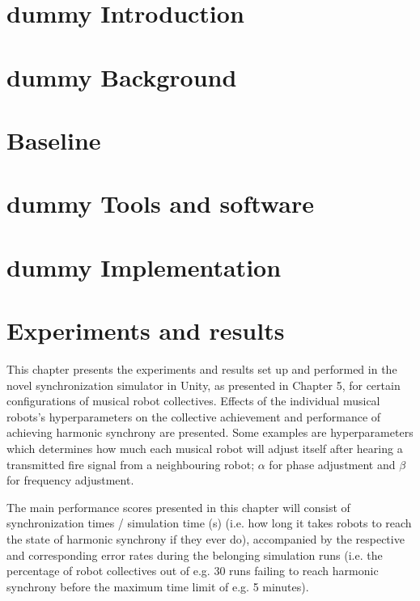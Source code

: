 


	\chapter{dummy Introduction}
	\chapter{dummy Background}
	\chapter{Baseline}
	\chapter{dummy Tools and software}
	\chapter{dummy Implementation}
	\chapter{Experiments and results}
	\setcounter{page}{1}
	\label{chap:experiments_and_results}
	
	This chapter presents the experiments and results set up and performed in the novel synchronization simulator in Unity, as presented in Chapter 5, for certain configurations of musical robot collectives. Effects of the individual musical robots's hyperparameters on the collective achievement and performance of achieving harmonic synchrony are presented. Some examples are hyperparameters which determines how much each musical robot will adjust itself after hearing a transmitted fire signal from a neighbouring robot; $\alpha$ for phase adjustment and $\beta$ for frequency adjustment.

	The main performance scores presented in this chapter will consist of synchronization times / simulation time (s) (i.e. how long it takes robots to reach the state of harmonic synchrony if they ever do), accompanied by the respective and corresponding error rates during the belonging simulation runs (i.e. the percentage of robot collectives out of e.g. 30 runs failing to reach harmonic synchrony before the maximum time limit of e.g. 5 minutes).

